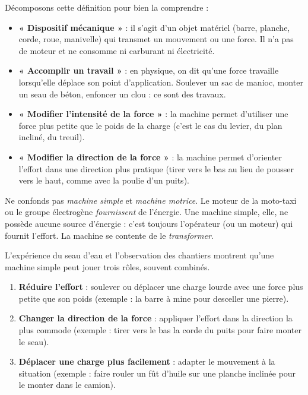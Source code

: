 \documentclass[11pt]{article}
\newcounter{popsec}
\newcounter{popsub}
\newcommand{\courssub}[1]{%
  \stepcounter{popsub}%
  \par\vspace{9pt}\noindent{\popxbold\fontsize{11.5}{13}\selectfont\color{popink}{\color{poporange}\thepopsec.\thepopsub}\hspace{6pt}#1}\par\nopagebreak\vspace{4pt}
}
\begin{document}
Décomposons cette définition pour bien la comprendre :

\begin{itemize}
\item \textbf{« Dispositif mécanique »} : il s'agit d'un objet matériel (barre, planche, corde, roue, manivelle) qui transmet un mouvement ou une force. Il n'a pas de moteur et ne consomme ni carburant ni électricité.
\item \textbf{« Accomplir un travail »} : en physique, on dit qu'une force travaille lorsqu'elle déplace son point d'application. Soulever un sac de manioc, monter un seau de béton, enfoncer un clou : ce sont des travaux.
\item \textbf{« Modifier l'intensité de la force »} : la machine permet d'utiliser une force plus petite que le poids de la charge (c'est le cas du levier, du plan incliné, du treuil).
\item \textbf{« Modifier la direction de la force »} : la machine permet d'orienter l'effort dans une direction plus pratique (tirer vers le bas au lieu de pousser vers le haut, comme avec la poulie d'un puits).
\end{itemize}

\begin{attention}
Ne confonds pas \emph{machine simple} et \emph{machine motrice}. Le moteur de la moto-taxi ou le groupe électrogène \emph{fournissent} de l'énergie. Une machine simple, elle, ne possède aucune source d'énergie : c'est toujours l'opérateur (ou un moteur) qui fournit l'effort. La machine se contente de le \emph{transformer}.
\end{attention}

\courssub{Les rôles d'une machine simple}

L'expérience du seau d'eau et l'observation des chantiers montrent qu'une machine simple peut jouer trois rôles, souvent combinés.

\begin{aretenir}
\begin{enumerate}
\item \textbf{Réduire l'effort} : soulever ou déplacer une charge lourde avec une force plus petite que son poids (exemple : la barre à mine pour desceller une pierre).
\item \textbf{Changer la direction de la force} : appliquer l'effort dans la direction la plus commode (exemple : tirer vers le bas la corde du puits pour faire monter le seau).
\item \textbf{Déplacer une charge plus facilement} : adapter le mouvement à la situation (exemple : faire rouler un fût d'huile sur une planche inclinée pour le monter dans le camion).
\end{enumerate}
\end{aretenir}
\end{document}
